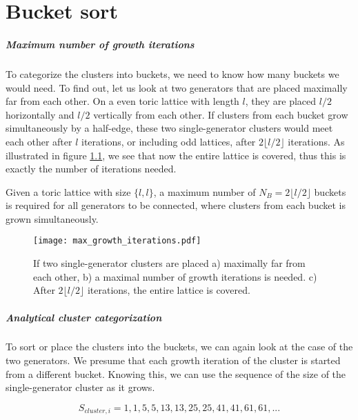 \chapter{Bucket sort}\label{ap.bucketsort}

\paragraph{Maximum number of growth iterations}
To categorize the clusters into buckets, we need to know how many buckets we would need. To find out, let us look at two generators that are placed maximally far from each other. On a even toric lattice with length $l$, they are placed $l/2$ horizontally and $l/2$ vertically from each other. If clusters from each bucket grow simultaneously by a half-edge, these two single-generator clusters would meet each other after $l$ iterations, or including odd lattices, after $2\lfloor l/2 \rfloor$ iterations. As illustrated in figure \ref{3.fig.maxgrowthit}, we see that now the entire lattice is covered, thus this is exactly the number of iterations needed.

\begin{lemma}
  Given a toric lattice with size $\{l,l\}$, a maximum number of $N_B = 2\lfloor l/2 \rfloor$ buckets is required for all generators to be connected, where clusters from each bucket is grown simultaneously.
\end{lemma}

\begin{figure}[h]
  \centering
  \texttt{[image: max\_growth\_iterations.pdf]}
  \caption{If two single-generator clusters are placed a) maximally far from each other, b) a maximal number of growth iterations is needed. c) After $2\lfloor l/2 \rfloor$ iterations, the entire lattice is covered.}\label{3.fig.maxgrowthit}
\end{figure}

\paragraph{Analytical cluster categorization}
To sort or place the clusters into the buckets, we can again look at the case of the two generators. We presume that each growth iteration of the cluster is started from a different bucket. Knowing this, we can use the sequence of the size of the single-generator cluster as it grows.

\begin{equation}\label{3.eq.sequence}
  S_{cluster, i} = 1, 1, 5, 5, 13, 13, 25, 25, 41, 41, 61, 61, ...
\end{equation}

